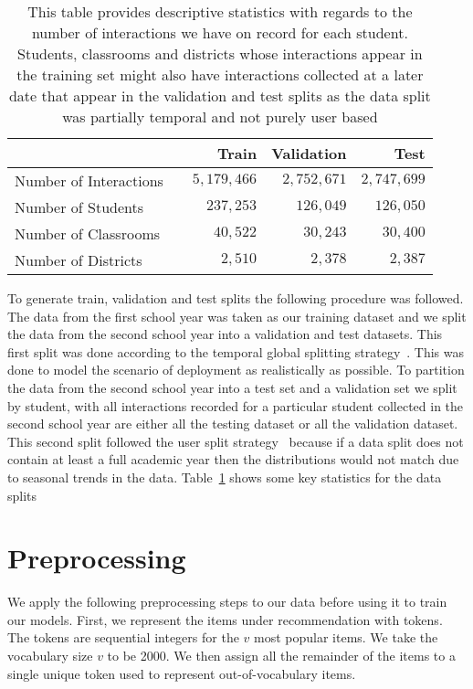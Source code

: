 \documentclass{article}
\begin{document}
\begin{table}
    
    \begin{tabular}{p{3.5cm}rrrr}
         \toprule
          && \multicolumn{1}{r}{\bf Train} & \multicolumn{1}{c}{\bf Validation} & \multicolumn{1}{r}{\bf Test}  \\
         \midrule
         Number of Interactions && $5{,}179{,}466$ & $2{,}752{,}671$  & $2{,}747{,}699$ \\
         Number of Students && $237{,}253$& $126{,}049$ & $126{,}050$ \\  
         Number of Classrooms && $40{,}522$ & $30{,}243$ & $30{,}400$ \\
         Number of Districts && $2{,}510$& $2{,}378$&  $2{,}387$\\

        \bottomrule
    \end{tabular}
    \newline
    \newline
    \caption{This table provides descriptive statistics with regards to the number of interactions we have on record for each student. Students, classrooms and districts whose interactions appear in the training set might also have interactions collected at a later date that appear in the validation and test splits as the data split was partially temporal and not purely user based}
    \label{table:data_split}
\end{table}

To generate train, validation and test splits the following procedure was followed. The data from the first school year was taken as our training dataset and we split the data from the second school year into a validation and test datasets.  This first split was done according to the temporal global splitting strategy~\cite{meng2020split}. This was done to model the scenario of deployment as realistically as possible. To partition the data from the second school year into a test set and a validation set we split by student, with all interactions recorded for a particular student collected in the second school year are either all the testing dataset or all the validation dataset. This second split followed the user split strategy~\cite{meng2020split} because if a data split does not contain at least a full academic year then the distributions would not match due to seasonal trends in the data. Table~\ref{table:data_split} shows some key statistics for the data splits

\section{Preprocessing}
 We apply the following preprocessing steps to our data before using it to train our models. 
First, we represent the items under recommendation with tokens. The tokens are sequential integers for the $v$ most popular items. We take the vocabulary size $v$ to be 2000. We then assign all the remainder of the items to a single unique token used to represent out-of-vocabulary items. 
\end{document}
